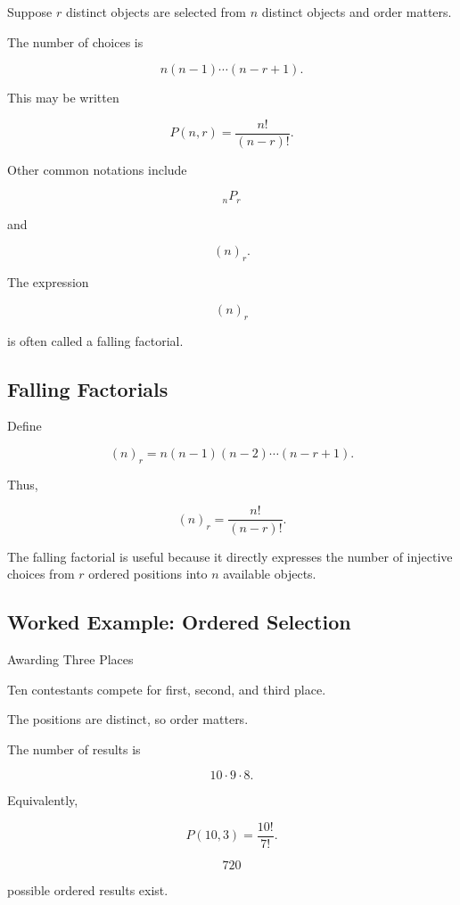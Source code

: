 Suppose \(r\) distinct objects are selected from \(n\) distinct objects
and order matters.

The number of choices is

\[
n(n-1)\cdots(n-r+1).
\]

This may be written

\[
\boxed{
P(n,r)
=
\frac{n!}{(n-r)!}.
}
\]

Other common notations include

\[
{}_nP_r
\]

and

\[
(n)_r.
\]

The expression

\[
(n)_r
\]

is often called a falling factorial.

\subsection{Falling Factorials}
\label{subsec:falling-factorials}

Define

\[
\boxed{
(n)_r
=
n(n-1)(n-2)\cdots(n-r+1).
}
\]

Thus,

\[
\boxed{
(n)_r
=
\frac{n!}{(n-r)!}.
}
\]

The falling factorial is useful because it directly expresses the
number of injective choices from \(r\) ordered positions into \(n\)
available objects.

\subsection{Worked Example: Ordered Selection}
\label{subsec:worked-ordered-selection}

\begin{workedexamplebox}{Awarding Three Places}

Ten contestants compete for first, second, and third place.

The positions are distinct, so order matters.

The number of results is

\[
10\cdot9\cdot8.
\]

Equivalently,

\[
P(10,3)
=
\frac{10!}{7!}.
\]

\begin{answerbox}
\[
\boxed{
720
}
\]

possible ordered results exist.
\end{answerbox}

\end{workedexamplebox}

